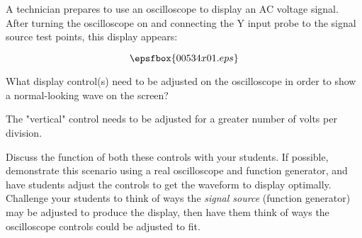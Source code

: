 

A technician prepares to use an oscilloscope to display an AC voltage signal.  After turning the oscilloscope on and connecting the Y input probe to the signal source test points, this display appears:

$$\epsfbox{00534x01.eps}$$

What display control(s) need to be adjusted on the oscilloscope in order to show a normal-looking wave on the screen?







The "vertical" control needs to be adjusted for a greater number of volts per division.







Discuss the function of both these controls with your students.  If possible, demonstrate this scenario using a real oscilloscope and function generator, and have students adjust the controls to get the waveform to display optimally.  Challenge your students to think of ways the {\it signal source} (function generator) may be adjusted to produce the display, then have them think of ways the oscilloscope controls could be adjusted to fit.




